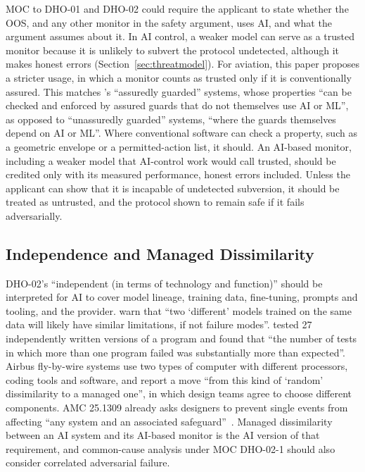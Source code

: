 \documentclass{aer}
\begin{document}
MOC to DHO-01 and DHO-02 could require the applicant to state whether the OOS, and any other monitor in the safety argument, uses AI, and what the argument assumes about it. In AI control, a weaker model can serve as a trusted monitor because it is unlikely to subvert the protocol undetected, although it makes honest errors (Section~\ref{sec:threatmodel}). For aviation, this paper proposes a stricter usage, in which a monitor counts as trusted only if it is conventionally assured. This matches \citeauthor{bloomfield2024assurance}'s \citeyearpar[Section~2.2]{bloomfield2024assurance} ``assuredly guarded'' systems, whose properties ``can be checked and enforced by assured guards that do not themselves use AI or ML'', as opposed to ``unassuredly guarded'' systems, ``where the guards themselves depend on AI or ML''. Where conventional software can check a property, such as a geometric envelope or a permitted-action list, it should. An AI-based monitor, including a weaker model that AI-control work would call trusted, should be credited only with its measured performance, honest errors included. Unless the applicant can show that it is incapable of undetected subversion, it should be treated as untrusted, and the protocol shown to remain safe if it fails adversarially.

\subsection{Independence and Managed Dissimilarity}\label{sec:independence}

DHO-02's ``independent (in terms of technology and function)'' should be interpreted for AI to cover model lineage, training data, fine-tuning, prompts and tooling, and the provider. \citet{mcdermid2024upstream} warn that ``two `different' models trained on the same data will likely have similar limitations, if not failure modes''. \citet{knight1986independence} tested 27 independently written versions of a program and found that ``the number of tests in which more than one program failed was substantially more than expected''. Airbus fly-by-wire systems use two types of computer with different processors, coding tools and software, and \citet[Section~3.2]{traverse2006airbus} report a move ``from this kind of `random' dissimilarity to a managed one'', in which design teams agree to choose different components. AMC 25.1309 already asks designers to prevent single events from affecting ``any system and an associated safeguard''~\citep[para.~11.c]{easa2021amc25}. Managed dissimilarity between an AI system and its AI-based monitor is the AI version of that requirement, and common-cause analysis under MOC DHO-02-1 should also consider correlated adversarial failure.
\end{document}
